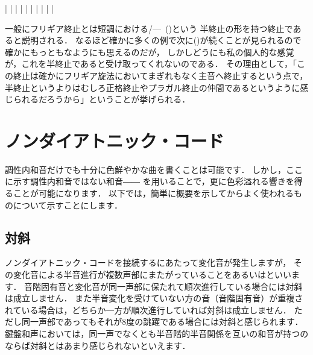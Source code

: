 \documentclass[dvipdfmx,uplatex,b5paper,openany,jbase=12Q,nomag*,textwidth-limit=44%
               ]{gachimuchi}[2020/05/05]
\begin{document}
\begin{Music}[.6\linewidth]
  \generalmeter{\meterC}%
  \Startpiece%
  \NOTEs%
  |%
  \en\bar%
  \NOTEs%
  |%
  \en\bar%
  \NOTEs%
  |%
  \en\doublebar%
  \NOTEs%
  |%
  \en\bar%
  \NOTEs%
  |%
  \en\bar%
  \NOTEs%
  |%
  \en\setdoublebar%
  \endpiece%
\end{Music}

\begin{FGN}
一般にフリギア終止とは短調における\Gniv\Min/\bFlat\Gnvi---\Gnv\ ()という
半終止の形を持つ終止であると説明される．
なるほど確かに多くの例で次に\Gni(\Min)が続くことが見られるので確かにもっともなようにも思えるのだが，
しかしどうにも私の個人的な感覚が，これを半終止であると受け取ってくれないのである．
その理由として，「この終止は確かにフリギア旋法においてまぎれもなく主音へ終止するという点で，
半終止というよりはむしろ正格終止やプラガル終止の仲間であるというように感じられるだろうから」ということが挙げられる．
\end{FGN}

\chapter{ノンダイアトニック・コード}
調性内和音だけでも十分に色鮮やかな曲を書くことは可能です．%
しかし，ここに示す調性内和音ではない和音――%
を用いることで，更に色彩溢れる響きを得ることが可能になります．
以下では，簡単に概要を示してからよく使われるものについて示すことにします．

\section{対斜}
ノンダイアトニック・コードを接続するにあたって変化音が発生しますが，
その変化音による半音進行が複数声部にまたがっていることをあるいはといいます．
音階固有音と変化音が同一声部に保たれて順次進行している場合には対斜は成立しません．
また半音変化を受けていない方の音（音階固有音）が重複されている場合は，どちらか一方が順次進行していれば対斜は成立しません．
ただし同一声部であってもそれが8度の跳躍である場合には対斜と感じられます．
鍵盤和声においては，同一声でなくとも半音階的半音関係を互いの和音が持つのならば対斜とはあまり感じられないといえます．
\end{document}

